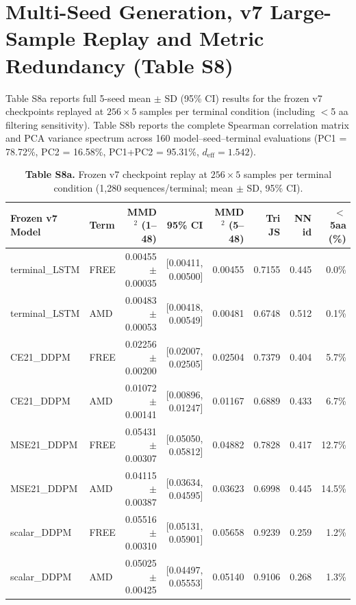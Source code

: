 \documentclass[11pt,a4paper]{article}
\newcommand{\rev}[1]{#1}
\begin{document}
\FloatBarrier
\section{\rev{Multi-Seed Generation, v7 Large-Sample Replay and Metric Redundancy (Table S8)}}
\rev{Table S8a reports full 5-seed mean $\pm$ SD (95\% CI) results for the frozen v7 checkpoints replayed at $256\times 5$ samples per terminal condition (including $<$5 aa filtering sensitivity). Table S8b reports the complete Spearman correlation matrix and PCA variance spectrum across 160 model--seed--terminal evaluations (PC1 = 78.72\%, PC2 = 16.58\%, PC1+PC2 = 95.31\%, $d_{\mathrm{eff}}=1.542$).}

\begin{table}[H]
\centering\footnotesize\setlength{\tabcolsep}{4.2pt}
\caption*{\rev{\textbf{Table S8a.} Frozen v7 checkpoint replay at $256\times 5$ samples per terminal condition (1,280 sequences/terminal; mean $\pm$ SD, 95\% CI).}}
\begin{tabular}{llrrrrrr}
\toprule
Frozen v7 Model & Term & MMD$^2$ (1--48) & 95\% CI & MMD$^2$ (5--48) & Tri JS & NN id & $<$5aa (\%) \\
\midrule
terminal\_LSTM & FREE & 0.00455$\pm$0.00035 & [0.00411, 0.00500] & 0.00455 & 0.7155 & 0.445 & 0.0\% \\
terminal\_LSTM & AMD & 0.00483$\pm$0.00053 & [0.00418, 0.00549] & 0.00481 & 0.6748 & 0.512 & 0.1\% \\
CE21\_DDPM & FREE & 0.02256$\pm$0.00200 & [0.02007, 0.02505] & 0.02504 & 0.7379 & 0.404 & 5.7\% \\
CE21\_DDPM & AMD & 0.01072$\pm$0.00141 & [0.00896, 0.01247] & 0.01167 & 0.6889 & 0.433 & 6.7\% \\
MSE21\_DDPM & FREE & 0.05431$\pm$0.00307 & [0.05050, 0.05812] & 0.04882 & 0.7828 & 0.417 & 12.7\% \\
MSE21\_DDPM & AMD & 0.04115$\pm$0.00387 & [0.03634, 0.04595] & 0.03623 & 0.6998 & 0.445 & 14.5\% \\
scalar\_DDPM & FREE & 0.05516$\pm$0.00310 & [0.05131, 0.05901] & 0.05658 & 0.9239 & 0.259 & 1.2\% \\
scalar\_DDPM & AMD & 0.05025$\pm$0.00425 & [0.04497, 0.05553] & 0.05140 & 0.9106 & 0.268 & 1.3\% \\
\bottomrule
\end{tabular}
\end{table}
\end{document}

